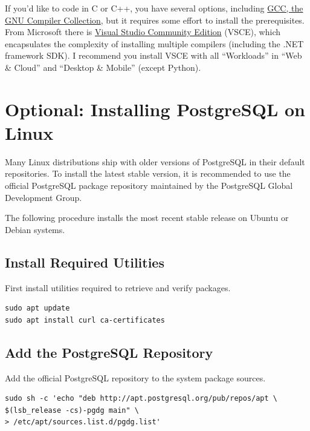 If you'd like to code in C or C++, you have several options, including \href{https://gcc.gnu.org}{GCC, the GNU Compiler Collection}, but it requires some effort to install the prerequisites. From Microsoft there is \href{https://visualstudio.microsoft.com/vs/community/}{Visual Studio Community Edition} (VSCE), which encapsulates the complexity of installing multiple compilers (including the .NET framework SDK). I recommend you install VSCE with all ``Workloads'' in ``Web \& Cloud'' and ``Desktop \& Mobile'' (except Python).

\section{Optional: Installing PostgreSQL on Linux}
Many Linux distributions ship with older versions of PostgreSQL in their
default repositories. To install the latest stable version, it is recommended
to use the official PostgreSQL package repository maintained by the
PostgreSQL Global Development Group.

The following procedure installs the most recent stable release on
Ubuntu or Debian systems.

\subsection{Install Required Utilities}
First install utilities required to retrieve and verify packages.

\begin{lstlisting}[basicstyle=\footnotesize\ttfamily]
sudo apt update
sudo apt install curl ca-certificates
\end{lstlisting}

\subsection{Add the PostgreSQL Repository}
Add the official PostgreSQL repository to the system package sources.

\begin{lstlisting}[basicstyle=\footnotesize\ttfamily]
sudo sh -c 'echo "deb http://apt.postgresql.org/pub/repos/apt \
$(lsb_release -cs)-pgdg main" \
> /etc/apt/sources.list.d/pgdg.list'
\end{lstlisting}

